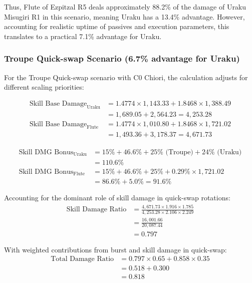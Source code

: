 \documentclass[12pt,a4paper]{article}
\begin{document}
Thus, Flute of Ezpitzal R5 deals approximately 88.2\% of the damage of Uraku Misugiri R1 in this scenario, meaning Uraku has a 13.4\% advantage. However, accounting for realistic uptime of passives and execution parameters, this translates to a practical 7.1\% advantage for Uraku.

\subsubsection{Troupe Quick-swap Scenario (6.7\% advantage for Uraku)}

For the Troupe Quick-swap scenario with C0 Chiori, the calculation adjusts for different scaling priorities:

\begin{align}
\text{Skill Base Damage}_{\text{Uraku}} &= 1.4774 \times 1,143.33 + 1.8468 \times 1,388.49 \\
&= 1,689.05 + 2,564.23 = 4,253.28 \\
\text{Skill Base Damage}_{\text{Flute}} &= 1.4774 \times 1,010.80 + 1.8468 \times 1,721.02 \\
&= 1,493.36 + 3,178.37 = 4,671.73
\end{align}

\begin{align}
\text{Skill DMG Bonus}_{\text{Uraku}} &= 15\% + 46.6\% + 25\% \text{ (Troupe)} + 24\% \text{ (Uraku)} \\
&= 110.6\% \\
\text{Skill DMG Bonus}_{\text{Flute}} &= 15\% + 46.6\% + 25\% + 0.29\% \times 1,721.02 \\
&= 86.6\% + 5.0\% = 91.6\%
\end{align}

Accounting for the dominant role of skill damage in quick-swap rotations:
\begin{align}
\text{Skill Damage Ratio} &= \frac{4,671.73 \times 1.916 \times 1.785}{4,253.28 \times 2.106 \times 2.249} \\
&= \frac{16,001.66}{20,087.44} \\
&= 0.797
\end{align}

With weighted contributions from burst and skill damage in quick-swap:
\begin{align}
\text{Total Damage Ratio} &= 0.797 \times 0.65 + 0.858 \times 0.35 \\
&= 0.518 + 0.300 \\
&= 0.818
\end{align}
\end{document}
